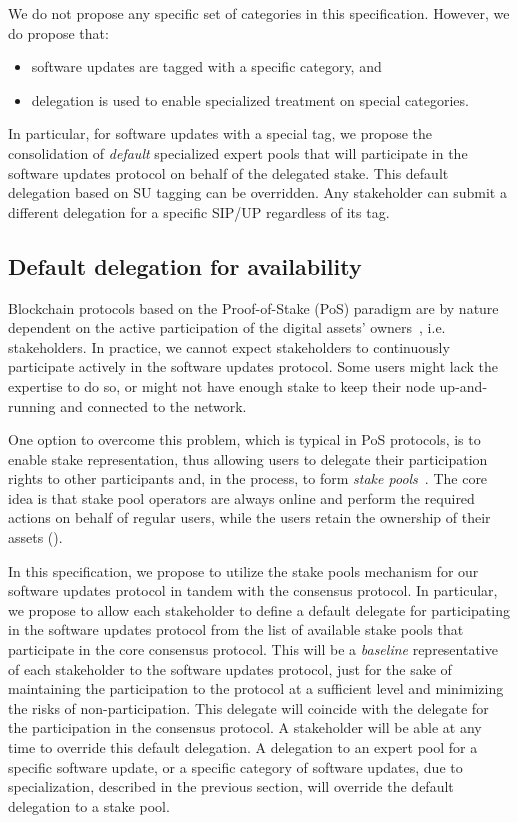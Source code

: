 \documentclass[11pt,a4paper]{article}
\begin{document}
We do not propose any specific set of categories in this specification. However,
we do propose that:
\begin{itemize}
\item software updates are tagged with a specific category, and
\item delegation is used to enable specialized treatment on special categories.
\end{itemize}
In particular, for software updates with a special tag, we propose the
consolidation of \emph{default} specialized expert pools that will participate
in the software updates protocol on behalf of the delegated stake.
%
This default delegation based on SU tagging can be overridden. Any stakeholder
can submit a different delegation for a specific SIP/UP regardless of its tag.

\subsection{Default delegation for availability}
\label{sec:defa-deleg-avail}

Blockchain protocols based on the Proof-of-Stake (PoS) paradigm are by nature
dependent on the active participation of the digital assets'
owners~\cite{stakepools}, i.e. stakeholders.
%
In practice, we cannot expect stakeholders to continuously participate actively
in the software updates protocol.
%
Some users might lack the expertise to do so, or might not have enough stake to
keep their node up-and-running and connected to the network.

One option to overcome this problem, which is typical in PoS protocols, is to
enable stake representation, thus allowing users to delegate their participation
rights to other participants and, in the process, to form \emph{stake
  pools}~\cite{stakepools}. The core idea is that stake pool operators are
always online and perform the required actions on behalf of regular users, while
the users retain the ownership of their assets (\cite{stakepools}).

In this specification, we propose to utilize the stake pools mechanism for our
software updates protocol in tandem with the consensus protocol. In particular,
we propose to allow each stakeholder to define a default delegate for
participating in the software updates protocol from the list of available stake
pools that participate in the core consensus protocol.
%
This will be a \emph{baseline} representative of each stakeholder to the
software updates protocol, just for the sake of maintaining the participation to
the protocol at a sufficient level and minimizing the risks of
non-participation. This delegate will coincide with the delegate for the
participation in the consensus protocol. A stakeholder will be able at any time
to override this default delegation. A delegation to an expert pool for a
specific software update, or a specific category of software updates, due to
specialization, described in the previous section, will override the default
delegation to a stake pool.
\end{document}
